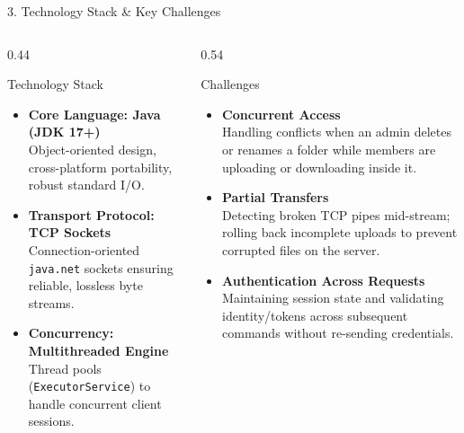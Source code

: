 \documentclass[t, aspectratio=169]{beamer}
\begin{document}
\begin{frame}{3. Technology Stack \& Key Challenges}
\begin{columns}[T]
\begin{column}{0.44\textwidth}
\begin{block}{Technology Stack}
\footnotesize
\begin{itemize}
    \setlength{\itemsep}{7pt}
    \item \textbf{Core Language: Java (JDK 17+)}\\
    Object-oriented design, cross-platform portability, robust standard I/O.
    \item \textbf{Transport Protocol: TCP Sockets}\\
    Connection-oriented \texttt{java.net} sockets ensuring reliable, lossless byte streams.
    \item \textbf{Concurrency: Multithreaded Engine}\\
    Thread pools (\texttt{ExecutorService}) to handle concurrent client sessions.
\end{itemize}
\end{block}
\end{column}

\begin{column}{0.54\textwidth}
\begin{block}{Challenges}
\footnotesize
\begin{itemize}
    \setlength{\itemsep}{3pt}
    \item \textbf{Concurrent Access}\\
    Handling conflicts when an admin deletes or renames a folder while members are uploading or downloading inside it.
    \item \textbf{Partial Transfers}\\
    Detecting broken TCP pipes mid-stream; rolling back incomplete uploads to prevent corrupted files on the server.
    \item \textbf{Authentication Across Requests}\\
    Maintaining session state and validating identity/tokens across subsequent commands without re-sending credentials.
\end{itemize}
\end{block}
\end{column}
\end{columns}
\end{frame}

\useStyleLogoOnly
\hustthankyou
\end{document}
